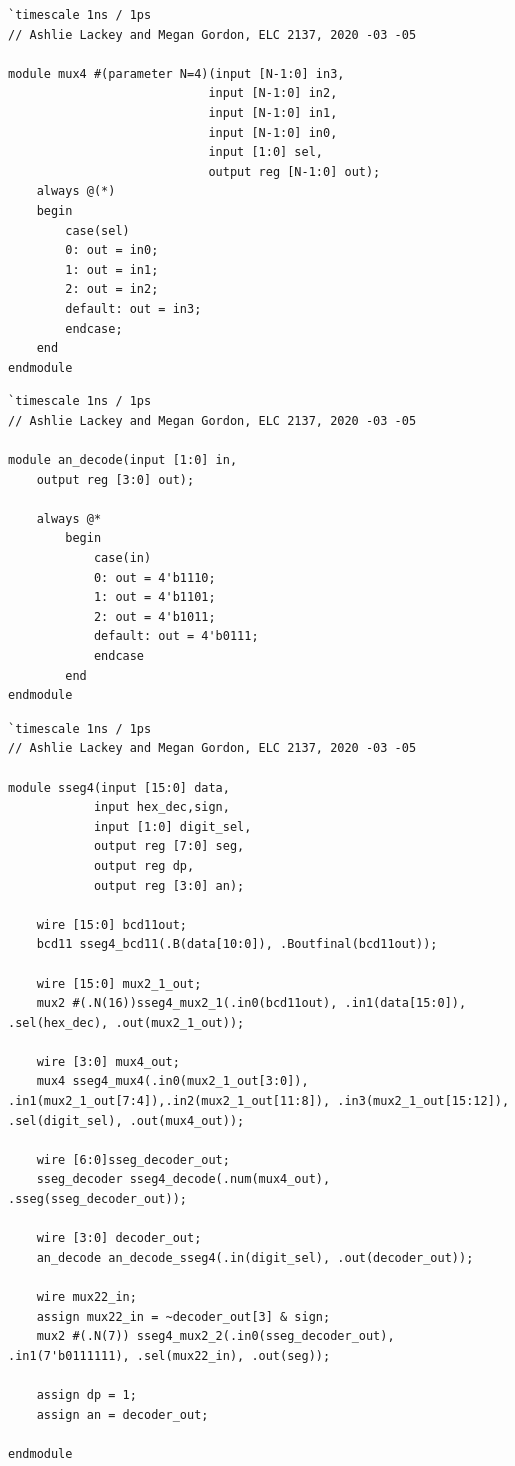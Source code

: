 \documentclass[11pt]{article}
\begin{document}
\begin{lstlisting}[style=Verilog,caption=Mux4 Module Code,label=code:ex ]
`timescale 1ns / 1ps
// Ashlie Lackey and Megan Gordon, ELC 2137, 2020 -03 -05

module mux4 #(parameter N=4)(input [N-1:0] in3, 
							input [N-1:0] in2, 
							input [N-1:0] in1, 
							input [N-1:0] in0,
							input [1:0] sel,
							output reg [N-1:0] out);
	always @(*)
	begin
		case(sel)
		0: out = in0;
		1: out = in1;
		2: out = in2;
		default: out = in3;
		endcase;
	end
endmodule
\end{lstlisting}

\begin{lstlisting}[style=Verilog,caption=andecoder Module Code,label=code:ex ]
`timescale 1ns / 1ps
// Ashlie Lackey and Megan Gordon, ELC 2137, 2020 -03 -05

module an_decode(input [1:0] in,
	output reg [3:0] out);
	
	always @*
		begin
			case(in)
			0: out = 4'b1110;
			1: out = 4'b1101;
			2: out = 4'b1011;
			default: out = 4'b0111;
			endcase
		end
endmodule
\end{lstlisting}

\begin{lstlisting}[style=Verilog,caption=sseg4 Module Code,label=code:ex ]
`timescale 1ns / 1ps
// Ashlie Lackey and Megan Gordon, ELC 2137, 2020 -03 -05

module sseg4(input [15:0] data,
			input hex_dec,sign,
			input [1:0] digit_sel,
			output reg [7:0] seg,
			output reg dp,
			output reg [3:0] an);

	wire [15:0] bcd11out;
	bcd11 sseg4_bcd11(.B(data[10:0]), .Boutfinal(bcd11out));
	
	wire [15:0] mux2_1_out;
	mux2 #(.N(16))sseg4_mux2_1(.in0(bcd11out), .in1(data[15:0]), .sel(hex_dec), .out(mux2_1_out));
	
	wire [3:0] mux4_out;
	mux4 sseg4_mux4(.in0(mux2_1_out[3:0]), .in1(mux2_1_out[7:4]),.in2(mux2_1_out[11:8]), .in3(mux2_1_out[15:12]), .sel(digit_sel), .out(mux4_out));
	
	wire [6:0]sseg_decoder_out;
	sseg_decoder sseg4_decode(.num(mux4_out), .sseg(sseg_decoder_out));
	
	wire [3:0] decoder_out;
	an_decode an_decode_sseg4(.in(digit_sel), .out(decoder_out));
	
	wire mux22_in;
	assign mux22_in = ~decoder_out[3] & sign;
	mux2 #(.N(7)) sseg4_mux2_2(.in0(sseg_decoder_out), .in1(7'b0111111), .sel(mux22_in), .out(seg));
	
	assign dp = 1;
	assign an = decoder_out;

endmodule
\end{lstlisting}
\end{document}
